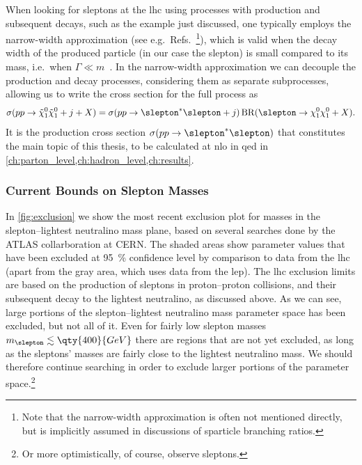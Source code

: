 When looking for sleptons at the \gls{lhc} using processes with production and subsequent decays, such as the example just discussed, one typically employs the narrow-width approximation (see e.g.\ Refs.~\cite{ATLAS:2025evx,ATLAS:2025wln,ATLAS:2022hbt,CMS:2019hos}\footnote{Note that the narrow-width approximation is often not mentioned directly, but is implicitly assumed in discussions of sparticle branching ratios.}), which is valid when the decay width of the produced particle (in our case the slepton) is small compared to its mass, i.e.\ when $\Gamma \ll m$~\cite{Schwartz:2014sze}.
In the narrow-width approximation we can decouple the production and decay processes, considering them as separate subprocesses, allowing us to write the cross section for the full process as
\begin{equation}
    \sigma(pp\to\tilde\chi_1^0\tilde\chi_1^0+j+X) = \sigma(pp\to\slepton^*\slepton+j) \operatorname{BR}(\slepton\to\chi_1^0\chi_1^0+X).
\end{equation}
It is the production cross section $\sigma(pp\to\slepton^*\slepton)$ that constitutes the main topic of this thesis, to be calculated at \gls{nlo} in \gls{qed} in \cref{ch:parton_level,ch:hadron_level,ch:results}.


\subsubsection{Current Bounds on Slepton Masses}

In \cref{fig:exclusion} we show the most recent exclusion plot for masses in the slepton--lightest neutralino mass plane, based on several searches done by the ATLAS collarboration at CERN. The shaded areas show parameter values that have been excluded at \qty{95}{\percent} confidence level by comparison to data from the \gls{lhc} (apart from the gray area, which uses data from the \gls{lep}).
The \gls{lhc} exclusion limits are based on the production of sleptons in proton--proton collisions, and their subsequent decay to the lightest neutralino, as discussed above.
As we can see, large portions of the slepton--lightest neutralino mass parameter space has been excluded, but not all of it. Even for fairly low slepton masses $m_\slepton \lesssim \qty{400}{GeV}$ there are regions that are not yet excluded, as long as the sleptons' masses are fairly close to the lightest neutralino mass.
We should therefore continue searching in order to exclude larger portions of the parameter space.\footnote{Or more optimistically, of course, observe sleptons.}

